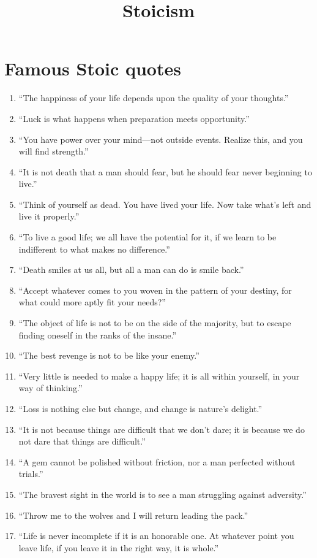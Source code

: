 \documentclass{article}
\title{Stoicism}
\begin{document}
\section{Famous Stoic quotes}
    \begin{enumerate}
        \item “The happiness of your life depends upon the quality of your thoughts.”
        \item “Luck is what happens when preparation meets opportunity.”
        \item “You have power over your mind—not outside events. Realize this, and you will find strength.”
        \item “It is not death that a man should fear, but he should fear never beginning to live.”
        \item “Think of yourself as dead. You have lived your life. Now take what’s left and live it properly.”
        \item “To live a good life; we all have the potential for it, if we learn to be indifferent to what makes no difference.”
        \item “Death smiles at us all, but all a man can do is smile back.”
        \item “Accept whatever comes to you woven in the pattern of your destiny, for what could more aptly fit your needs?”
        \item “The object of life is not to be on the side of the majority, but to escape finding oneself in the ranks of the insane.”
        \item “The best revenge is not to be like your enemy.”
        \item “Very little is needed to make a happy life; it is all within yourself, in your way of thinking.”
        \item “Loss is nothing else but change, and change is nature’s delight.”
        \item “It is not because things are difficult that we don’t dare; it is because we do not dare that things are difficult.”
        \item “A gem cannot be polished without friction, nor a man perfected without trials.”
        \item “The bravest sight in the world is to see a man struggling against adversity.”
        \item “Throw me to the wolves and I will return leading the pack.”
        \item “Life is never incomplete if it is an honorable one. At whatever point you leave life, if you leave it in the right way, it is whole.”

\end{enumerate}
\end{document}
